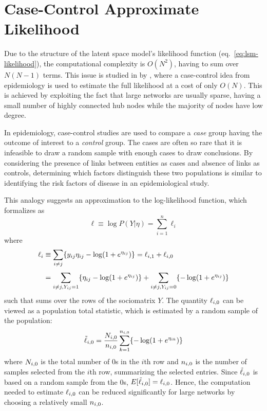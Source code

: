 \section{Case-Control Approximate Likelihood}

Due to the structure of the latent space model's likelihood function (eq.~\ref{eq:lsm-likelihood}), the computational complexity is $O(N^2)$, having to sum over $N(N-1)$ terms. This issue is studied in \cite{raftery2012fast} by \citeauthor{raftery2012fast}, where a case-control idea from epidemiology is used to estimate the full likelihood at a cost of only $O(N)$. This is achieved by exploiting the fact that large networks are usually sparse, having a small number of highly connected hub nodes while the majority of nodes have low degree.

In epidemiology, case-control studies are used to compare a \emph{case} group having the outcome of interest to a \emph{control} group. The cases are often so rare that it is infeasible to draw a random sample with enough cases to draw conclusions.
By considering the presence of links between entities as cases and absence of links as controls, determining which factors distinguish these two populations is similar to identifying the risk factors of disease in an epidemiological study.

This analogy suggests an approximation to the log-likelihood function, which \citeauthor*{raftery2012fast} formalizes as
\begin{equation}
\label{eq:case-likelihood-approx}
    \ell \equiv \log P(Y|\eta)=\sum_{i=1}^n \ell_i
\end{equation}
where
\begin{equation}
    \setlength{\jot}{0.5\baselineskip}
    \begin{split}
        \ell_i &\equiv \sum_{i\neq j}\{\sub(y)\sub(\eta)-\log(1+e^{\sub(\eta)})\} = \sub(\ell)(i,1) + \sub(\ell)(i,0)\\
        &= \sum_{i\neq j, \sub(Y)=1} \{\sub(\eta)-\log(1+e^{\sub(\eta)}) \} + \sum_{i\neq j, \sub(Y)=0} \{-\log(1+e^{\sub(\eta)}) \} \\
    \end{split}
\end{equation}
such that  sums over the rows of the sociomatrix $Y$. The quantity $\sub(\ell)(i,0)$ can be viewed as a population total statistic, which is estimated by a random sample of the population:
\begin{equation}
    \sub(\tilde{\ell})(i,0)=\frac{\sub(N)(i,0)}{\sub(n)(i,0)} \sum_{k=1}^{\sub(n)(i,0)} \{ -\log(1+e^{\sub(\eta)(ik)}) \}
\end{equation}
where $\sub(N)(i,0)$ is the total number of 0s in the $i$th row and $\sub(n)(i,0)$ is the number of samples selected from the $i$th row, summarizing the selected entries. Since $\sub(\tilde{\ell})(i,0)$ is based on a random sample from the 0s, $E[\sub(\tilde{\ell})(i,0)] = \sub(\ell)(i,0)$. Hence, the computation needed to estimate $\sub(\ell)(i,0)$ can be reduced significantly for large networks by choosing a relatively small $\sub(n)(i,0)$.

